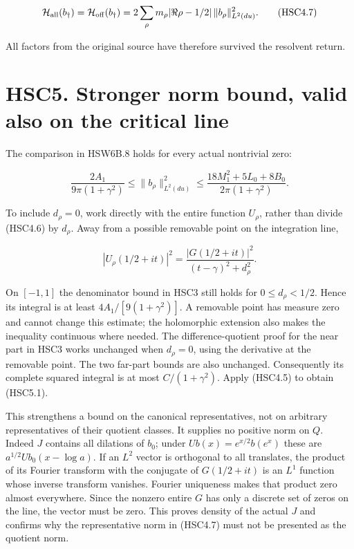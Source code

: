 \[
 \mathcal H_{\rm all}(b_\dagger)
 =\mathcal H_{\rm off}(b_\dagger)
 =2\sum_\rho m_\rho|\Re\rho-1/2|\,
 \|b_\rho\|_{L^2(du)}^2.
\tag{HSC4.7}
\]

All factors from the original source have therefore survived the
resolvent return.

\section{HSC5. Stronger norm bound, valid also on the critical
line}\label{hsc5.-stronger-norm-bound-valid-also-on-the-critical-line}

The comparison in HSW6B.8 holds for every actual nontrivial zero:

\[
 \boxed{
 \frac{2A_1}{9\pi(1+\gamma^2)}
 \le\|b_\rho\|_{L^2(du)}^2
 \le\frac{18M_1^2+5L_0+8B_0}{2\pi(1+\gamma^2)}.}
\tag{HSC5.1}
\]

To include \(d_\rho=0\), work directly with the entire function
\(U_\rho\), rather than divide (HSC4.6) by \(d_\rho\). Away from a
possible removable point on the integration line,

\[
 |U_\rho(1/2+it)|^2
 =\frac{|G(1/2+it)|^2}{(t-\gamma)^2+d_\rho^2}.
\]

On \([-1,1]\) the denominator bound in HSC3 still holds for
\(0\le d_\rho<1/2\). Hence its integral is at least
\(4A_1/[9(1+\gamma^2)]\). A removable point has measure zero and cannot
change this estimate; the holomorphic extension also makes the
inequality continuous where needed. The difference-quotient proof for
the near part in HSC3 works unchanged when \(d_\rho=0\), using the
derivative at the removable point. The two far-part bounds are also
unchanged. Consequently its complete squared integral is at most
\(C/(1+\gamma^2)\). Apply (HSC4.5) to obtain (HSC5.1).

This strengthens a bound on the canonical representatives, not on
arbitrary representatives of their quotient classes. It supplies no
positive norm on \(Q\). Indeed \(J\) contains all dilations of \(b_0\);
under \(Ub(x)=e^{x/2}b(e^x)\) these are \(a^{1/2}Ub_0(x-\log a)\). If an
\(L^2\) vector is orthogonal to all translates, the product of its
Fourier transform with the conjugate of \(G(1/2+it)\) is an \(L^1\)
function whose inverse transform vanishes. Fourier uniqueness makes that
product zero almost everywhere. Since the nonzero entire \(G\) has only
a discrete set of zeros on the line, the vector must be zero. This
proves density of the actual \(J\) and confirms why the representative
norm in (HSC4.7) must not be presented as the quotient norm.

